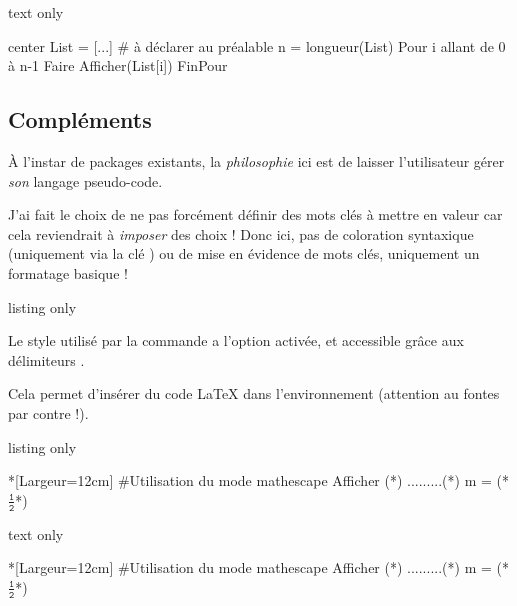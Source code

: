 \begin{PresCodeSortiePL}{text only}
\begin{PseudoCodeAlt}[Largeur=15cm,PremLigne=7,Couleur]{center}
List = [...]          # à déclarer au préalable
n = longueur(List)
Pour i allant de 0 à n-1 Faire
	Afficher(List[i])
FinPour
\end{PseudoCodeAlt}
\end{PresCodeSortiePL}

\subsection{Compléments}

\begin{warningblock}
À l'instar de packages existants, la \textit{philosophie} ici est de laisser l'utilisateur gérer \textit{son} langage pseudo-code.

J'ai fait le choix de ne pas forcément définir des \textsf{mots clés} à mettre en valeur car cela reviendrait à \textit{imposer} des choix ! Donc ici, pas de coloration syntaxique (uniquement via la clé ) ou de mise en évidence de mots clés, uniquement un formatage basique !
\end{warningblock}

\begin{PresCodeTexPL}{listing only}
\end{PresCodeTexPL}

\begin{noteblock}
Le style  utilisé par la commande a l'option  activée, et accessible grâce aux délimiteurs .

Cela permet d'insérer du code \LaTeX{} dans l'environnement  (attention au fontes par contre !).
\end{noteblock}

\begin{PresCodeTexPL}{listing only}
\begin{PseudoCode}*[Largeur=12cm]{} %
#Utilisation du mode mathescape
Afficher (*\og*) .........(*\fg*)
m = (*$\tfrac{\texttt{1}}{\texttt{2}}$*)
\end{PseudoCode}
\end{PresCodeTexPL}

\begin{PresCodeSortiePL}{text only}
\begin{PseudoCode}*[Largeur=12cm]{}
#Utilisation du mode mathescape
Afficher (*\og*) .........(*\fg*)
m = (*$\tfrac{\texttt{1}}{\texttt{2}}$*)
\end{PseudoCode}
\end{PresCodeSortiePL}

